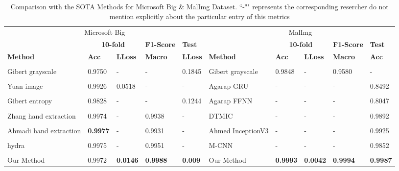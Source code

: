 \documentclass[pdflatex,sn-mathphys]{sn-jnl}%
\begin{document}
\begin{table}[ht]
   \centering
	\caption{Comparison with the SOTA Methods for Microsoft Big \& MalImg Dataset. ``-"" represents the corresponding resercher do not mention explicitly about the particular entry of this metrics}
	\begin{tabular}{|p{1cm}|p{0.88cm}|p{0.88cm}|p{0.88cm}|p{0.88cm}|p{1cm}|p{0.88cm}|p{0.88cm}|p{0.88cm}|p{0.88cm}|}
		\midrule
		 \multicolumn{5}{c}{Microsoft Big} & \multicolumn{5}{c}{MalImg} \\
   \cmidrule{1-10}
		\textbf{} & \multicolumn{2}{c}{\textbf{10-fold}} & \textbf{F1-Score} & \textbf{Test} &
  \textbf{} & 
\multicolumn{2}{c}{\textbf{10-fold}} & \textbf{F1-Score} & \textbf{Test}\\
 \cmidrule{1-10}
		\textbf{Method} & \textbf{Acc} & \textbf{LLoss} & \textbf{Macro} & \textbf{LLoss} & \textbf{Method} & \textbf{Acc} & \textbf{LLoss} & \textbf{Macro} & \textbf{Acc}\\\\
		Gibert grayscale & 0.9750 & - & - & 0.1845 & Gibert grayscale & 0.9848 & - & 0.9580 & -\\\\
	
		Yuan image & 0.9926 & 0.0518 & - & - & Agarap GRU & - & - & - & 0.8492\\\\
              	
		Gibert entropy & 0.9828 & - & - & 0.1244 & Agarap FFNN & - & - & - & 0.8047\\\\
			
		Zhang hand extraction & 0.9974 & - & 0.9938 & - & DTMIC & - & - & - & 0.9892\\\\
		
		Ahmadi hand extraction & \textbf{0.9977} & - & 0.9931 & - & Ahmed InceptionV3 & - & - & - & 0.9925\\\\
			
		hydra & 0.9975 & -	& 0.9951 & - & M-CNN & - & - & - & 0.9852\\\\
	
		\hline
        \hline
		Our Method & 0.9972 & \textbf{0.0146} & \textbf{0.9988} & \textbf{0.009} & Our Method & \textbf{0.9993} & \textbf{0.0042} & \textbf{0.9994} & \textbf{0.9987}\\
		\hline
	\end{tabular}

    \label{comparsion}
\end{table}
\end{document}
